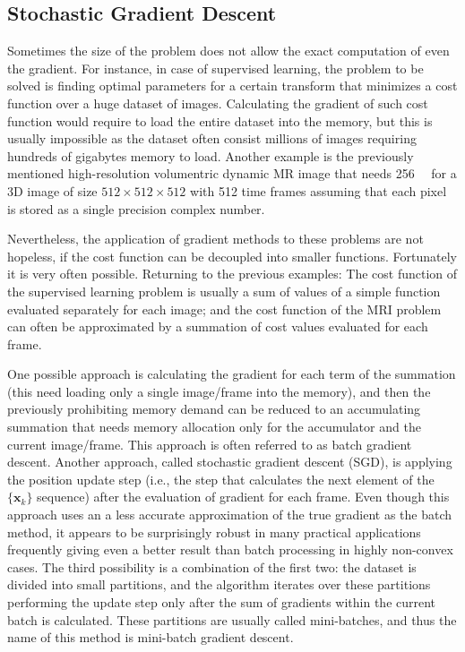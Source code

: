 \subsection{Stochastic Gradient Descent}
Sometimes the size of the problem does not allow the exact computation of even the gradient. For instance, in case of supervised learning, the problem to be solved is finding optimal parameters for a certain transform that minimizes a cost function over a huge dataset of images. Calculating the gradient of such cost function would require to load the entire dataset into the memory, but this is usually impossible as the dataset often consist millions of images requiring hundreds of gigabytes memory to load. Another example is the previously mentioned high-resolution volumentric dynamic MR image that needs \SI{256}{\gibi\byte} for a 3D image of size $512\times512\times512$ with 512 time frames assuming that each pixel is stored as a single precision complex number.

Nevertheless, the application of gradient methods to these problems are not hopeless, if the cost function can be decoupled into smaller functions. Fortunately it is very often possible. Returning to the previous examples: The cost function of the supervised learning problem is usually a sum of values of a simple function evaluated separately for each image; and the cost function of the MRI problem can often be approximated by a summation of cost values evaluated for each frame.

One possible approach is calculating the gradient for each term of the summation (this need loading only a single image/frame into the memory), and then the previously prohibiting memory demand can be reduced to an accumulating summation that needs memory allocation only for the accumulator and the current image/frame. This approach is often referred to as batch gradient descent. Another approach, called stochastic gradient descent (SGD), is applying the position update step (i.e., the step that calculates the next element of the $\{\mathbf{x}_k\}$ sequence) after the evaluation of gradient for each frame. Even though this approach uses an a less accurate approximation of the true gradient as the batch method, it appears to be surprisingly robust in many practical applications frequently giving even a better result than batch processing in highly non-convex cases. The third possibility is a combination of the first two: the dataset is divided into small partitions, and the algorithm iterates over these partitions performing the update step only after the sum of gradients within the current batch is calculated. These partitions are usually called mini-batches, and thus the name of this method is mini-batch gradient descent.

